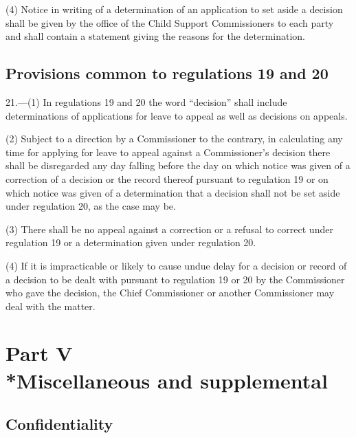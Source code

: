 \documentclass[12pt,a4paper]{article}
\begin{document}
(4) Notice in writing of a determination of an application to set aside a decision shall be given by the office of the Child Support Commissioners to each party and shall contain a statement giving the reasons for the determination.

\subsection[21. Provisions common to regulations 19 and 20]{Provisions common to regulations 19 and 20}

21.—(1) In regulations 19 and 20 the word “decision” shall include determinations of applications for leave to appeal as well as decisions on appeals.

(2) Subject to a direction by a Commissioner to the contrary, in calculating any time for applying for leave to appeal against a Commissioner’s decision there shall be disregarded any day falling before the day on which notice was given of a correction of a decision or the record thereof pursuant to regulation 19 or on which notice was given of a determination that a decision shall not be set aside under regulation 20, as the case may be.

(3) There shall be no appeal against a correction or a refusal to correct under regulation 19 or a determination given under regulation 20.

(4) If it is impracticable or likely to cause undue delay for a decision or record of a decision to be dealt with pursuant to regulation 19 or 20 by the Commissioner who gave the decision, the Chief Commissioner or another Commissioner may deal with the matter.

\section[Part V --- Miscellaneous and supplemental]{Part V\\*Miscellaneous and supplemental}

\renewcommand\parthead{--- Part V}

\subsection[22. Confidentiality]{Confidentiality}

%
%
\end{document}
